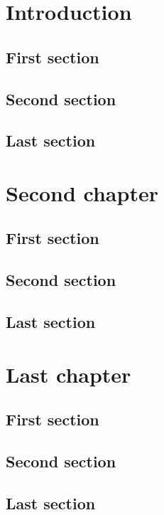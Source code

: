 \documentclass{book}
\begin{document}
\tableofcontents

\chapter{Introduction}
\lipsum[1]

\section{First section}
\lipsum[2-3]

\section{Second section}
\lipsum[4-5]

\section{Last section}
\lipsum[6-7]

\chapter{Second chapter}
\lipsum[1]

\section{First section}
\lipsum[2-3]

\section{Second section}
\lipsum[4-5]

\section{Last section}
\lipsum[6-7]

\chapter{Last chapter}
\lipsum[1]

\section{First section}
\lipsum[2-3]

\section{Second section}
\lipsum[4-5]

\section{Last section}
\lipsum[6-7]
\end{document}
